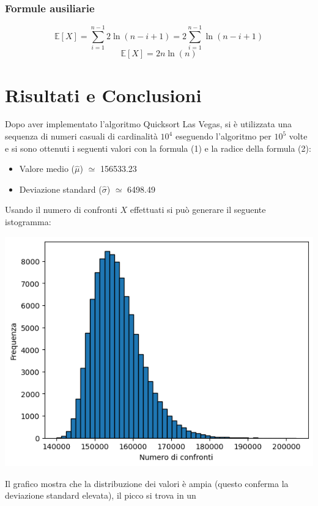 \documentclass[12pt]{article}
\begin{document}
\subsubsection{Formule ausiliarie}
\begin{equation}
    \mathbb{E}[X] = \sum_{i=1}^{n-1}2\ln(n-i+1) = 2\sum_{i=1}^{n-1}\ln(n-i+1)
\end{equation}
\begin{equation}
    \mathbb{E}[X]=2n\ln(n)
\end{equation}

\section{Risultati e Conclusioni}
Dopo aver implementato l'algoritmo Quicksort Las Vegas, 
si è utilizzata una sequenza di numeri casuali di 
cardinalità $10^{4}$ eseguendo l'algoritmo per $10^{5}$ 
volte e si sono ottenuti i seguenti valori con la formula (1) e la radice della formula (2):
\begin{itemize}
    \item Valore medio ($\hat{\mu}$) $\simeq $ 156533.23
    \item Deviazione standard ($\hat{\sigma}$) $\simeq$ 6498.49
\end{itemize}
Usando il numero di confronti $X$ effettuati si può generare il seguente 
istogramma:
\begin{center}
    \includegraphics[scale=1]{Istogramma.png}
\end{center}
Il grafico mostra che la distribuzione dei valori è ampia (questo 
conferma la deviazione standard elevata), il picco si trova in un 
\end{document}
